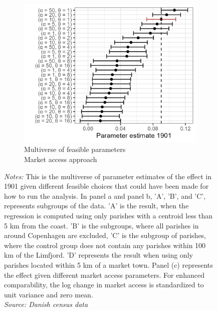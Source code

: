 \begin{figure}[H]
\begin{subfigure}[b]{0.45\textwidth}
    \end{subfigure}
    \vspace{0.45cm}
    \begin{subfigure}[b]{0.45\textwidth}
        \centering
        \caption{Multiverse of feasible parameters\\Market access approach} \label{fig:mult3_1787}
        \includegraphics[width=\textwidth]{Plots/Regression_plots/Multiverse_MA_param.png}
    \end{subfigure}
    \parbox{0.9\textwidth}{
    \caption*{\footnotesize \textit{Notes:} This is the multiverse of parameter estimates of the effect in 1901 given different feasible choices that could have been made for how to run the analysis. In panel a and panel b, 'A', 'B', and 'C', represents subgroups of the data. 'A' is the result, when the regression is computed using only parishes with a centroid less than 5 km from the coast. 'B' is the subgroups, where all parishes in around Copenhagen are excluded, 'C' is the subgroup of parishes, where the control group does not contain any parishes within 100 km of the Limfjord. 'D' represents the result when using only parishes located within 5 km of a market town. Panel (c) represents the effect given different market access parameters. For enhanced comparability, the log change in market access is standardized to unit variance and zero mean. \\ \textit{Source: Danish census data}}
} \label{fig:pop2_1787}
\end{figure}

